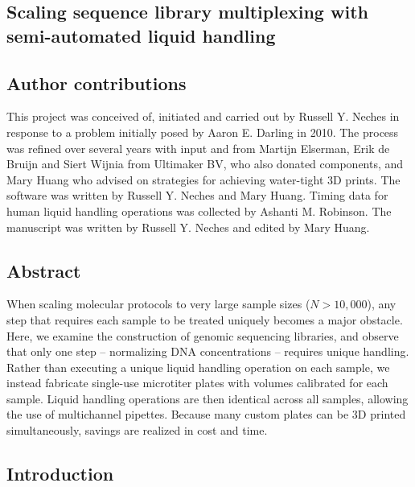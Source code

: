 \begin{refsection}

\chapter{Scaling sequence library multiplexing with semi-automated liquid handling}


\section{Author contributions}

This project was conceived of, initiated and carried out by Russell Y. Neches in response to a problem initially posed by Aaron E. Darling in 2010. The process was refined over several years with input and from Martijn Elserman, Erik de Bruijn and Siert Wijnia from Ultimaker BV, who also donated components, and Mary Huang who advised on strategies for achieving water-tight 3D prints. The software was written by Russell Y. Neches and Mary Huang. Timing data for human liquid handling operations was collected by Ashanti M. Robinson. The manuscript was written by Russell Y. Neches and edited by Mary Huang.

\section{Abstract}

When scaling molecular protocols to very large sample sizes ($N > 10,000$), any step that requires each sample to be treated uniquely becomes a major obstacle. Here, we examine the construction of genomic sequencing libraries, and observe that only one step -- normalizing DNA concentrations -- requires unique handling. Rather than executing a unique liquid handling operation on each sample, we instead fabricate single-use microtiter plates with volumes calibrated for each sample. Liquid handling operations are then identical across all samples, allowing the use of multichannel pipettes. Because many custom plates can be 3D printed simultaneously, savings are realized in cost and time.

\section{Introduction}


\end{refsection}
